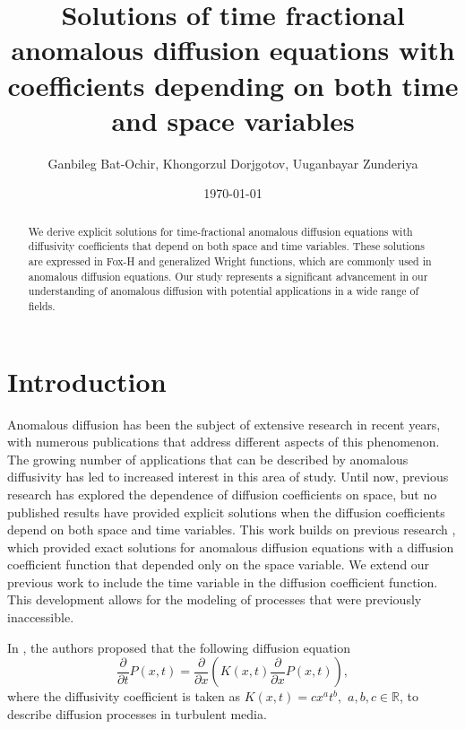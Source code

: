 \documentclass[12pt]{article}
\title{\textbf{Solutions of time fractional anomalous diffusion equations with coefficients depending on both time and space variables}}
\author{Ganbileg Bat-Ochir, Khongorzul Dorjgotov, Uuganbayar Zunderiya}
\date{\today}%
\theoremstyle{definition}
\begin{document}
\maketitle
\begin{abstract}
  We derive explicit solutions for time-fractional anomalous diffusion equations with diffusivity coefficients that depend on both space and time variables. These solutions are expressed in Fox-H and generalized Wright functions, which are commonly used in anomalous diffusion equations. Our study represents a significant advancement in our understanding of anomalous diffusion with potential applications in a wide range of fields.
\end{abstract}
\section{Introduction}

Anomalous diffusion has been the subject of extensive research in recent years, with numerous publications that address different aspects of this phenomenon. The growing number of applications that can be described by anomalous diffusivity has led to increased interest in this area of study. Until now, previous research has explored the dependence of diffusion coefficients on space, but no published results have provided explicit solutions when the diffusion coefficients depend on both space and time variables. This work builds on previous research \cite{old1974,wyss1986,schneider1989,metz94,main96,Luchko,pod1999,metzler2000,main03,kilb2005,kilbas2006,main07,main10,tar2019}, which provided exact solutions for anomalous diffusion equations with a diffusion coefficient function that depended only on the space variable. We extend our previous work to include the time variable in the diffusion coefficient function. This development allows for the modeling of processes that were previously inaccessible.

In \cite{hents}, the authors proposed that the following diffusion equation
\begin{equation*}
\frac{\partial }{\partial t}P(x,t)=\frac{\partial }{\partial x}\left(K(x,t)\frac{\partial}{\partial x}P(x,t)\right),  
\end{equation*}
where the diffusivity coefficient  is taken as $K(x,t)=cx^at^b,$ $a,b,c\in \mathbb{R}$,  to describe diffusion processes in turbulent media. 
\end{document}
